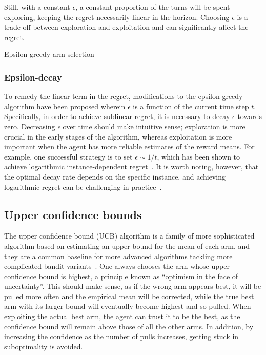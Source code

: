 Still, with a constant $\epsilon$, a constant proportion of the turns will be spent exploring, keeping the regret necessarily linear in the horizon.
Choosing $\epsilon$ is a trade-off between exploration and exploitation and can significantly affect the regret.

\begin{algorithm}
    \caption{Epsilon-greedy arm selection}
    \label{alg:eps_greedy}
    \eIf{$t \leq mk$}{
    \Return $(t \mod k) + 1$\;
    }{
    Sample $u$ from $[0,1)$ uniformly\;
    \eIf{$u < \epsilon$}{
        Sample $a$ from $\mathcal{A}$ uniformly\;
        \Return $a$\;
    }{
        \Return $\argmax_{a \in \mathcal{A}}\hat{\mu}_a$\;
    }
    }
\end{algorithm}

\subsubsection{Epsilon-decay}
To remedy the linear term in the regret, modifications to the epsilon-greedy algorithm have been proposed wherein $\epsilon$ is a function of the current time step $t$.
Specifically, in order to achieve sublinear regret, it is necessary to decay $\epsilon$ towards zero.
Decreasing $\epsilon$ over time should make intuitive sense; exploration is more crucial in the early stages of the algorithm, whereas exploitation is more important when the agent has more reliable estimates of the reward means.
For example, one successful strategy is to set $\epsilon \sim 1/t$, which has been shown to achieve logarithmic instance-dependent regret~\autocite{auer2002}.
It is worth noting, however, that the optimal decay rate depends on the specific instance, and achieving logarithmic regret can be challenging in practice~\autocite{bubeck2012}.


\subsection{Upper confidence bounds}
\label{sec:ucb}
The upper confidence bound (UCB) algorithm is a family of more sophisticated algorithm based on estimating an upper bound for the mean of each arm, and they are a common baseline for more advanced algorithms tackling more complicated bandit variants~\autocite{li2010}.
One always chooses the arm whose upper confidence bound is highest, a principle known as \enquote{optimism in the face of uncertainty}.
This should make sense, as if the wrong arm appears best, it will be pulled more often and the empirical mean will be corrected, while the true best arm with its larger bound will eventually become highest and so pulled.
When exploiting the actual best arm, the agent can trust it to be the best, as the confidence bound will remain above those of all the other arms.
In addition, by increasing the confidence as the number of pulls increases, getting stuck in suboptimality is avoided.

